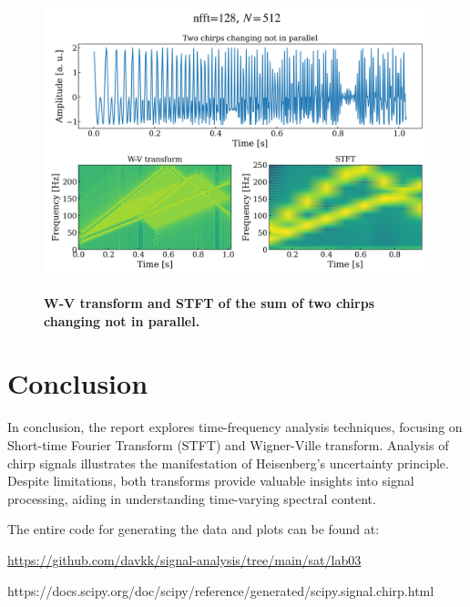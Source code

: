 \documentclass[13pt,a4paper]{article}
\begin{document}
\begin{figure}[ht!]
    \centering
    \caption{\textbf{W-V transform and STFT of the sum of two chirps changing not in parallel.}}
    \includegraphics[width=\linewidth]{stft_nonparallel.png}
    \label{fig:stft_nonparallel}
\end{figure}
\pagebreak


\section{Conclusion}

In conclusion, the report explores time-frequency analysis techniques, focusing on Short-time Fourier Transform (STFT) and Wigner-Ville transform. Analysis of chirp signals illustrates the manifestation of Heisenberg's uncertainty principle. Despite limitations, both transforms provide valuable insights into signal processing, aiding in understanding time-varying spectral content.

The entire code for generating the data and plots can be found at:

\url{https://github.com/davkk/signal-analysis/tree/main/sat/lab03}

\begin{thebibliography}{9}
 https://docs.scipy.org/doc/scipy/reference/generated/scipy.signal.chirp.html
\end{thebibliography}
\end{document}
